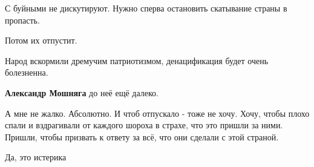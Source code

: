 С буйными не дискутируют. Нужно сперва остановить скатывание страны в пропасть.

Потом их отпустит.

\begin{itemize} %

Народ вскормили дремучим патриотизмом, денацификация будет очень болезненна.

\textbf{Александр Мошняга} до неё ещё далеко.


А мне не жалко. Абсолютно. И чтоб отпускало - тоже не хочу. Хочу, чтобы плохо
спали и вздрагивали от каждого шороха в страхе, что это пришли за ними. Пришли,
чтобы призвать к ответу за всё, что они сделали с этой страной.

Да, это истерика
\end{itemize} %
